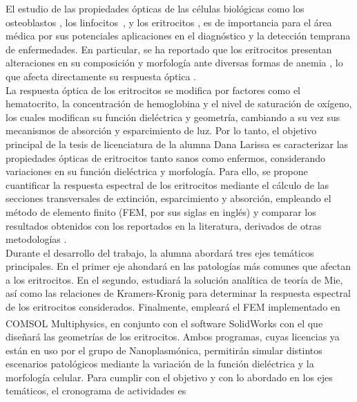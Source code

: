 \documentclass[11pt,letterpaper]{article}
\begin{document}
	El estudio de las propiedades ópticas de las células biológicas como los osteoblastos \cite{antunesOpticalPropertiesBone2019}, los linfocitos~\cite{yoonIdentificationNonactivatedLymphocytes2017}, y los eritrocitos \cite{bosschaartLiteratureReviewNovel2014}, es de importancia para el área médica por sus potenciales aplicaciones en el diagnóstico y la detección temprana de enfermedades.  En particular, se ha reportado que los eritrocitos presentan alteraciones en su composición y morfología ante diversas formas de anemia \cite{bosschaartLiteratureReviewNovel2014}, lo que afecta directamente su respuesta óptica \cite{wriedtLightScatteringSingle2006,meinkeOpticalPropertiesPlatelets2007}.\\
	
	La respuesta óptica de los eritrocitos se modifica por factores como el hematocrito, la concentración de hemoglobina y el nivel de saturación de oxígeno, los cuales modifican su función dieléctrica y geometría, cambiando a su vez sus mecanismos de absorción y esparcimiento de luz. Por lo tanto, el objetivo principal de la tesis de licenciatura de la alumna Dana Larissa es caracterizar las propiedades ópticas de eritrocitos tanto sanos como enfermos, considerando variaciones en su función dieléctrica y morfología. Para ello, se propone cuantificar la respuesta espectral de los eritrocitos mediante el cálculo de las secciones transversales de extinción, esparcimiento y absorción, empleando el método de elemento finito (FEM, por sus siglas en inglés) y comparar los resultados obtenidos con los reportados en la literatura, derivados de otras metodologías \cite{ergulComputationalStudyScattering2010,wriedtLightScatteringSingle2006}.\\
	
	Durante el desarrollo del trabajo, la alumna abordará tres ejes temáticos principales. En el primer eje ahondará en las patologías más comunes que afectan a los eritrocitos. En el segundo, estudiará la solución analítica de teoría de Mie, así como las relaciones de Kramers-Kronig \cite{lucariniKramersKronigRelationsOptical2005} para determinar la respuesta espectral de los eritrocitos considerados. Finalmente, empleará el FEM implementado en COMSOL Multiphysics\textsuperscript{\texttrademark}, en conjunto con el software SolidWorks con el que diseñará las geometrías de los eritrocitos.  Ambos programas, cuyas licencias ya están en uso por el grupo de Nanoplasmónica, permitirán simular distintos escenarios patológicos mediante la variación de la función dieléctrica y la morfología celular. Para cumplir con el objetivo y con lo abordado en  los ejes temáticos, el cronograma de actividades es
	
\end{document}
